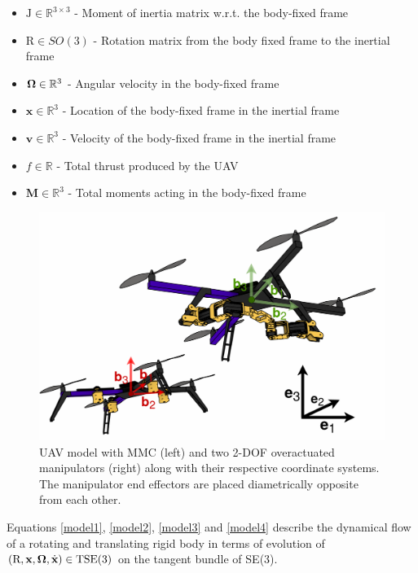 \begin{itemize}
	\item $\text{J} \in \mathbb{R}^{3 \times 3}$ - Moment of inertia matrix w.r.t. the body-fixed frame
	
	\item $\text{R} \in SO(3)$ - Rotation matrix from the body fixed frame to the inertial frame
	
	\item $\boldsymbol{\Omega} \in \mathbb{R}^3$ - Angular velocity in the body-fixed frame
	
	\item $\textbf{x} \in \mathbb{R}^3$ - Location of the body-fixed frame in the inertial frame
	
	\item $\textbf{v} \in \mathbb{R}^3$ - Velocity of the body-fixed frame in the inertial frame
	
	\item $f \in \mathbb{R}$ - Total thrust produced by the UAV
	
	\item $\textbf{M} \in \mathbb{R}^3$ - Total moments acting in the body-fixed frame
\end{itemize}
\begin{figure}[h!]
	\includegraphics[width=\columnwidth]{pictures/uav.png}	
	\centering
	\caption{UAV model with MMC (left) and two 2-DOF overactuated manipulators (right) along with their respective coordinate systems. The manipulator end effectors are placed diametrically opposite from each other.}
	\label{fig:uav_model}
\end{figure}
\noindent Equations \eqref{model1}, \eqref{model2}, \eqref{model3} and \eqref{model4} describe the dynamical flow of a rotating and translating rigid body in terms of evolution of $(\text{R},\textbf{x},\boldsymbol{\Omega},\dot{\textbf{x}})\in \text{TSE}(3)$ on the tangent bundle of SE(3). 

